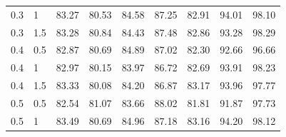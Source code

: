 \begin{table}[!t]
\begin{center}
\begin{tabular}{lllllllll}
\\ 

\multicolumn{1}{l}{0.3}                     & \multicolumn{1}{l}{1}                 & \multicolumn{1}{l}{83.27} & \multicolumn{1}{l}{ 80.53} & \multicolumn{1}{l}{ 84.58} & \multicolumn{1}{l}{ 87.25} & \multicolumn{1}{l}{82.91} & \multicolumn{1}{l}{ 94.01} & \multicolumn{1}{l}{ 98.10} 

\\ 

\multicolumn{1}{l}{0.3}                     & \multicolumn{1}{l}{1.5}                   & \multicolumn{1}{l}{83.28} & \multicolumn{1}{l}{80.84 } & \multicolumn{1}{l}{ 84.43} & \multicolumn{1}{l}{ 87.48} & \multicolumn{1}{l}{82.86} & \multicolumn{1}{l}{ 93.28} & \multicolumn{1}{l}{ 98.29} 


\\ \hline 

\multicolumn{1}{l}{0.4}                     & \multicolumn{1}{l}{0.5}                   & \multicolumn{1}{l}{82.87} & \multicolumn{1}{l}{80.69} & \multicolumn{1}{l}{ 84.89} & \multicolumn{1}{l}{ 87.02} & \multicolumn{1}{l}{82.30} & \multicolumn{1}{l}{ 92.66} & \multicolumn{1}{l}{ 96.66} 

\\ 
\multicolumn{1}{l}{0.4}                     & \multicolumn{1}{l}{1}                 & \multicolumn{1}{l}{82.97} & \multicolumn{1}{l}{ 80.15} & \multicolumn{1}{l}{ 83.97} & \multicolumn{1}{l}{ 86.72} & \multicolumn{1}{l}{82.69} & \multicolumn{1}{l}{ 93.91} & \multicolumn{1}{l}{98.23} 

\\ 
\multicolumn{1}{l}{0.4}                     & \multicolumn{1}{l}{1.5}                  & \multicolumn{1}{l}{83.33} & \multicolumn{1}{l}{ 80.08} & \multicolumn{1}{l}{ 84.20} & \multicolumn{1}{l}{ 86.87} & \multicolumn{1}{l}{83.17} & \multicolumn{1}{l}{ 93.96} & \multicolumn{1}{l}{ 97.77} 

\\ \hline 
\multicolumn{1}{l}{0.5}                     & \multicolumn{1}{l}{0.5}                & \multicolumn{1}{l}{82.54} & \multicolumn{1}{l}{81.07 } & \multicolumn{1}{l}{ 83.66} & \multicolumn{1}{l}{ 88.02} & \multicolumn{1}{l}{81.81} & \multicolumn{1}{l}{ 91.87} & \multicolumn{1}{l}{ 97.73} 

\\ 
\multicolumn{1}{l}{0.5}                     & \multicolumn{1}{l}{1}                    & \multicolumn{1}{l}{83.49} & \multicolumn{1}{l}{80.69 } & \multicolumn{1}{l}{84.96 } & \multicolumn{1}{l}{87.18} & \multicolumn{1}{l}{83.16} & \multicolumn{1}{l}{94.20} & \multicolumn{1}{l}{98.12 } 


\end{tabular}
\end{center}
\end{table}
